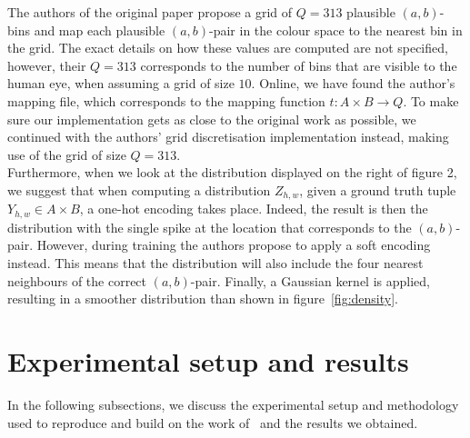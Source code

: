 \documentclass{article}
\begin{document}
The authors of the original paper propose a grid of $Q=313$ plausible $(a, b)$-bins and map each plausible $(a, b)$-pair in the colour space to the nearest bin in the grid. The exact details on how these values are computed are not specified, however, their $Q=313$ corresponds to the number of bins that are visible to the human eye, when assuming a grid of size $10$. Online, we have found the author's mapping file, which corresponds to the mapping function $t:A\times B\rightarrow Q$. To make sure our implementation gets as close to the original work as possible, we continued with the authors' grid discretisation implementation instead, making use of the grid of size $Q=313$.\\
Furthermore, when we look at the distribution displayed on the right of figure 2, we suggest that when computing a distribution $Z_{h,w}$, given a ground truth tuple $Y_{h,w}\in A\times B$, a one-hot encoding takes place. Indeed, the result is then the distribution with the single spike at the location that corresponds to the $(a, b)$-pair. However, during training the authors propose to apply a soft encoding instead. This means that the distribution will also include the four nearest neighbours of the correct $(a, b)$-pair. Finally, a Gaussian kernel is applied, resulting in a smoother distribution than shown in figure~\ref{fig:density}.

\section{Experimental setup and results}
In the following subsections, we discuss the experimental setup and methodology used to reproduce and build
on the work of~\cite{colourful} and the results we obtained.
\end{document}
